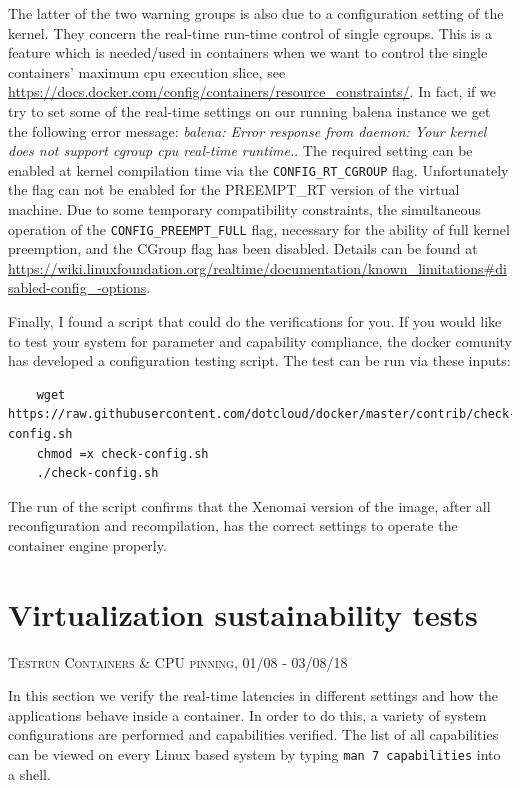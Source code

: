 \documentclass[]{scrartcl}
\begin{document}
The latter of the two warning groups is also due to a configuration setting of the kernel. They concern the real-time run-time control of single cgroups. This is a feature which is needed/used in containers when we want to control the single containers' maximum cpu execution slice, see \url{https://docs.docker.com/config/containers/resource_constraints/}. 
In fact, if we try to set some of the real-time settings on our running balena instance we get the following error message: \textit{balena: Error response from daemon: Your kernel does not support cgroup cpu real-time runtime.}.
The required setting can be enabled at kernel compilation time via the \texttt{CONFIG\_RT\_CGROUP} flag. 
Unfortunately the flag can not be enabled for the PREEMPT\_RT version of the virtual machine. Due to some temporary compatibility constraints, the simultaneous operation of the \texttt{CONFIG\_PREEMPT\_FULL} flag, necessary for the ability of full kernel preemption, and the CGroup flag has been disabled. Details can be found at \url{https://wiki.linuxfoundation.org/realtime/documentation/known_limitations#disabled-config_-options}.

Finally, I found a script that could do the verifications for you. If you would like to test your system for parameter and capability compliance, the docker comunity has developed a configuration testing script. The test can be run via these inputs:

\begin{verbatim}
	wget https://raw.githubusercontent.com/dotcloud/docker/master/contrib/check-config.sh
	chmod =x check-config.sh
	./check-config.sh
\end{verbatim}

The run of the script confirms that the Xenomai version of the image, after all reconfiguration and recompilation, has the correct settings to operate the container engine properly.

\section{Virtualization sustainability tests}

{\small\textsc{Testrun Containers \& CPU pinning, 01/08 - 03/08/18} \bigskip}


In this section we verify the real-time latencies in different settings and how the applications behave inside a container. In order to do this, a variety of system configurations are performed and capabilities verified. The list of all capabilities can be viewed on every Linux based system by typing \texttt{man 7 capabilities} into a shell.
\end{document}
